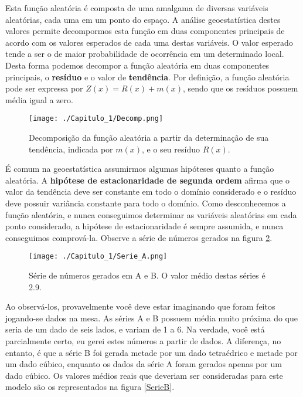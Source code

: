 Esta função aleatória é composta de uma amalgama de diversas variáveis aleatórias, cada uma em um ponto do espaço. A análise geoestatística destes valores permite decompormos esta função em duas componentes principais de acordo com os valores esperados de cada uma destas variáveis. O valor esperado tende a ser o de maior probabilidade de ocorrência em um determinado local. Desta forma podemos decompor a função aleatória em duas componentes principais, o \textbf{resíduo} e o valor de \textbf{tendência}. Por definição, a função aleatória pode ser expressa por $Z(x) = R(x) + m(x)$, sendo que os resíduos possuem média igual a zero.

\FloatBarrier
\begin{figure}[!htb]
	\centering
	\texttt{[image: ./Capitulo\_1/Decomp.png]}	
	\caption{Decomposição da função aleatória a partir da determinação de sua tendência, indicada por $m(x)$, e o seu resíduo $R(x)$. }
	\label{decompos}
\end{figure}
\FloatBarrier


É comum na geoestatística assumirmos algumas hipóteses quanto a função aleatória. A \textbf{hipótese de estacionaridade de segunda ordem} afirma que o valor da tendência deve ser constante em todo o domínio considerado e o resíduo deve possuir variância constante para todo o domínio. Como desconhecemos a função aleatória, e nunca conseguimos determinar as variáveis aleatórias em cada ponto considerado, a hipótese de estacionaridade é sempre assumida, e nunca conseguimos comprová-la. Observe a série de números gerados na figura \ref{SerieA}. 

\FloatBarrier
\begin{figure}[!htb]
	\centering
	\texttt{[image: ./Capitulo\_1/Serie\_A.png]}	
	\caption{Série de números gerados em A e B. O valor médio destas séries é 2.9.} 
	\label{SerieA}
\end{figure}
\FloatBarrier

Ao observá-los, provavelmente você deve estar imaginando que foram feitos jogando-se dados na mesa. As séries A e B possuem média muito próxima do que seria de um dado de seis lados, e variam de 1 a 6. Na verdade, você está parcialmente certo, eu gerei estes números a partir de dados. A diferença, no entanto, é que a série B foi gerada metade por um dado tetraédrico e metade por um dado cúbico, enquanto os dados da série A foram gerados apenas por um dado cúbico. Os valores médios reais que deveriam ser consideradas para este modelo são os representados na figura \ref{SerieB}. 


